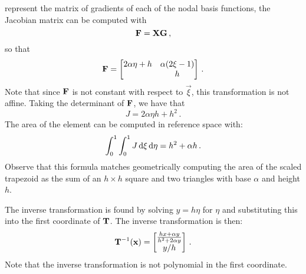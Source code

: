 \documentclass[../doc.tex]{subfiles}
\begin{document}
represent the matrix of gradients of each of the nodal basis functions, the Jacobian matrix can be computed with 
	\begin{equation}
		\boldsymbol{\mathrm{F}} = \boldsymbol{\mathrm{X}} \boldsymbol{\mathrm{G}} \,, 
	\end{equation}
so that 
	\begin{equation}
		\boldsymbol{\mathrm{F}} = \begin{bmatrix} \label{fem:Jacobian_example}
			2 \alpha \eta + h & \alpha(2\xi - 1) \\ 
			& h 
		\end{bmatrix} \,. 
	\end{equation}
Note that since $\boldsymbol{\mathrm{F}}$ is not constant with respect to $\vec{\xi}$, this transformation is not affine. 
Taking the determinant of $\boldsymbol{\mathrm{F}}$, we have that 
	\begin{equation}
		J = 2 \alpha \eta h + h^2 \,. 		
	\end{equation}
The area of the element can be computed in reference space with: 
	\begin{equation}
		\int_0^1 \int_0^1 J \mathop{}\!\mathrm{d} \xi \mathop{}\!\mathrm{d} \eta = h^2 + \alpha h \,. 
	\end{equation}
Observe that this formula matches geometrically computing the area of the scaled trapezoid as the sum of an $h\times h$ square and two triangles with base $\alpha$ and height $h$.  

The inverse transformation is found by solving $y = h\eta$ for $\eta$ and substituting this into the first coordinate of $\boldsymbol{\mathrm{T}}$. The inverse transformation is then: 
	\begin{equation}
		\boldsymbol{\mathrm{T}}^{-1}(\boldsymbol{\mathrm{x}}) = \begin{bmatrix} 
			\frac{h x + \alpha y}{h^2 + 2\alpha y} \\ 
			y/h 
		\end{bmatrix} \,. 
	\end{equation}
Note that the inverse transformation is not polynomial in the first coordinate. 
\end{document}
